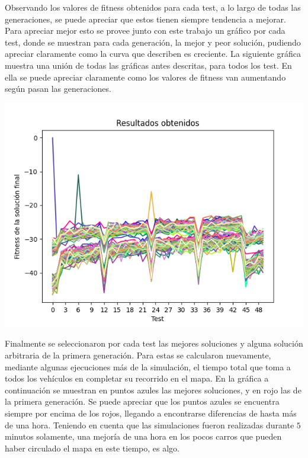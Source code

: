 \documentclass[colorinlistoftodos,twoside,twocolumn]{article} %
\begin{document}
	Observando los valores de fitness obtenidos para cada test, a lo largo de todas las generaciones, se puede apreciar que estos tienen siempre tendencia a mejorar. Para apreciar mejor esto se provee junto con este trabajo un gr\'afico por cada test, donde se muestran para cada generaci\'on, la mejor y peor soluci\'on, pudiendo apreciar claramente como la curva que describen es creciente. La siguiente gr\'afica muestra una uni\'on de todas las gr\'aficas antes descritas, para todos los test. En ella se puede apreciar claramente como los valores de fitness van aumentando seg\'un pasan las generaciones.

	\begin{center}
		\includegraphics[width=\columnwidth]{all_graphics.png}
	\end{center}

	Finalmente se seleccionaron por cada test las mejores soluciones y alguna soluci\'on arbitraria de la primera generaci\'on. Para estas se calcularon nuevamente, mediante algunas ejecuciones m\'as de la simulaci\'on, el tiempo total que toma a todos los veh\'iculos en completar su recorrido en el mapa. En la gr\'afica a continuaci\'on se muestran en puntos azules las mejores soluciones, y en rojo las de la primera generaci\'on. Se puede apreciar que los puntos azules se encuentra siempre por encima de los rojos, llegando a encontrarse diferencias de hasta m\'as de una hora. Teniendo en cuenta que las simulaciones fueron realizadas durante $5$ minutos solamente, una mejor\'ia de una hora en los pocos carros que pueden haber circulado el mapa en este tiempo, es algo.
	
\end{document}
